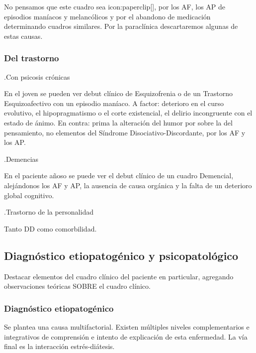 \documentclass{scrbook}
\begin{document}
No pensamos que este cuadro sea icon:paperclip[], por los AF, los AP de episodios maníacos y melancólicos y por el abandono de medicación determinando cuadros similares. Por la paraclínica descartaremos algunas de estas causas.
\subsubsection*{Del trastorno}
.Con psicosis crónicas

En el joven se pueden ver debut clínico de Esquizofrenia o de un Trastorno Esquizoafectivo con un episodio maníaco. A factor: deterioro en el curso evolutivo, el hipopragmatismo o el corte existencial, el delirio incongruente con el estado de ánimo. En contra: prima la alteración del humor por sobre la del pensamiento, no elementos del Síndrome Disociativo-Discordante, por los AF y los AP.

.Demencias

En el paciente añoso se puede ver el debut clínico de un cuadro Demencial, alejándonos los AF y AP, la ausencia de causa orgánica y la falta de un deterioro global cognitivo.

.Trastorno de la personalidad

Tanto DD como comorbilidad.
\subsection*{Diagnóstico etiopatogénico y psicopatológico}
Destacar elementos del cuadro clínico del paciente en particular, agregando observaciones teóricas SOBRE el cuadro clínico.
\subsubsection*{Diagnóstico etiopatogénico}
Se plantea una causa multifactorial. Existen múltiples niveles complementarios e integrativos de comprensión e intento de explicación de esta enfermedad. La vía final es la interacción estrés-diátesis.
\end{document}
